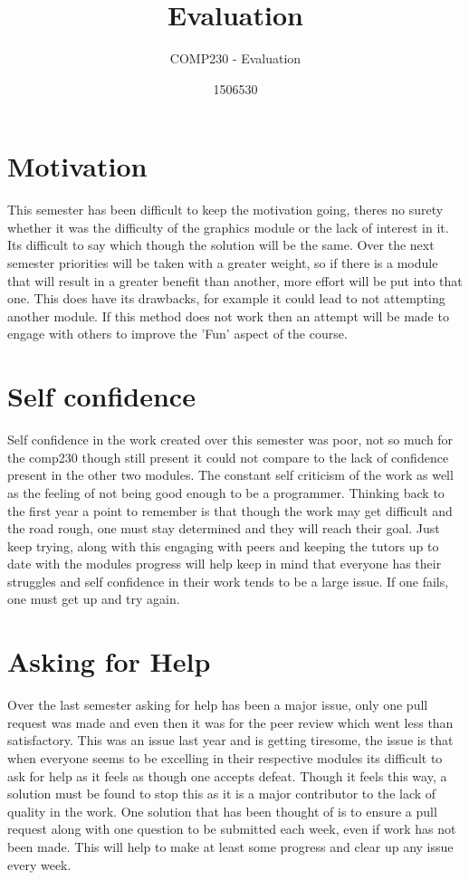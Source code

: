 \documentclass{scrartcl}
\title{Evaluation}
\subtitle{COMP230 - Evaluation}
\author{1506530}
\begin{document}
	
\maketitle

\section{Motivation}

This semester has been difficult to keep the motivation going, theres no surety whether it was the difficulty of the graphics module or the lack of interest in it. Its difficult to say which though the solution will be the same. Over the next semester priorities will be taken with a greater weight, so if there is a module that will result in a greater benefit than another, more effort will be put into that one. This does have its drawbacks, for example it could lead to not attempting another module. If this method does not work then an attempt will be made to engage with others to improve the 'Fun' aspect of the course.

\section{Self confidence}

Self confidence in the work created over this semester was poor, not so much for the comp230 though still present it could not compare to the lack of confidence present in the other two modules. The constant self criticism of the work as well as the feeling of not being good enough to be a programmer. Thinking back to the first year a point to remember is that though the work may get difficult and the road rough, one must stay determined and they will reach their goal. Just keep trying, along with this engaging with peers and keeping the tutors up to date with the modules progress will help keep in mind that everyone has their struggles and self confidence in their work tends to be a large issue. If one fails, one must get up and try again.

\section{Asking for Help}

Over the last semester asking for help has been a major issue, only one pull request was made and even then it was for the peer review which went less than satisfactory. This was an issue last year and is getting tiresome, the issue is that when everyone seems to be excelling in their respective modules its difficult to ask for help as it feels as though one accepts defeat. Though it feels this way, a solution must be found to stop this as it is a major contributor to the lack of quality in the work. One solution that has been thought of is to ensure a pull request along with one question to be submitted each week, even if work has not been made. This will help to make at least some progress and clear up any issue every week.
\end{document}
